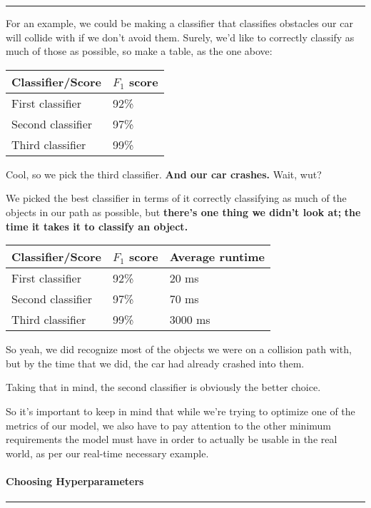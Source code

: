 \documentclass[
]{article}
\begin{document}
\begin{center}\rule{0.5\linewidth}{0.5pt}\end{center}

For an example, we could be making a classifier that classifies
obstacles our car will collide with if we don't avoid them. Surely, we'd
like to correctly classify as much of those as possible, so make a
table, as the one above:

\begin{longtable}[]{@{}ll@{}}
\toprule
Classifier/Score & \(F_1\) score\tabularnewline
\midrule
\endhead
First classifier & 92\%\tabularnewline
Second classifier & 97\%\tabularnewline
Third classifier & 99\%\tabularnewline
\bottomrule
\end{longtable}

Cool, so we pick the third classifier. \textbf{And our car crashes.}
Wait, wut?

We picked the best classifier in terms of it correctly classifying as
much of the objects in our path as possible, but \textbf{there's one
thing we didn't look at;} \textbf{the time it takes it to classify an
object.}

\begin{longtable}[]{@{}lll@{}}
\toprule
Classifier/Score & \(F_1\) score & Average runtime\tabularnewline
\midrule
\endhead
First classifier & 92\% & 20 ms\tabularnewline
Second classifier & 97\% & 70 ms\tabularnewline
Third classifier & 99\% & 3000 ms\tabularnewline
\bottomrule
\end{longtable}

So yeah, we did recognize most of the objects we were on a collision
path with, but by the time that we did, the car had already crashed into
them.

Taking that in mind, the second classifier is obviously the better
choice.

So it's important to keep in mind that while we're trying to optimize
one of the metrics of our model, we also have to pay attention to the
other minimum requirements the model must have in order to actually be
usable in the real world, as per our real-time necessary example.

\hypertarget{header-n268}{%
\paragraph{\texorpdfstring{\textbf{Choosing
Hyperparameters}}{Choosing Hyperparameters}}\label{header-n268}}

\begin{center}\rule{0.5\linewidth}{0.5pt}\end{center}
\end{document}
